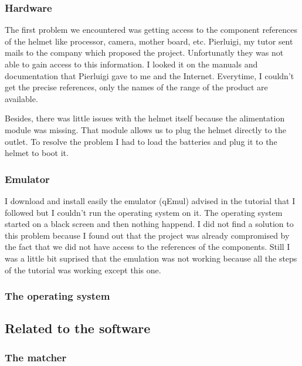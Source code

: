 	\subsubsection{Hardware}
	\par The first problem we encountered was getting access to the component references of the helmet like processor, camera, mother board, etc. Pierluigi, my tutor sent mails to the company which proposed the project. Unfortunatly they was not able to gain access to this information. I looked it on the manuals and documentation that Pierluigi gave to me and the Internet. Everytime, I couldn't get the precise references, only the names of the range of the product are available.

	\par Besides, there was little issues with the helmet itself because the alimentation module was missing. That module allows us to plug the helmet directly to the outlet. To resolve the problem I had to load the batteries and plug it to the helmet to boot it.

	\subsubsection{Emulator}
	
	\par I download and install easily the emulator (qEmul) advised in the tutorial that I followed but I couldn't run the operating system on  it. The operating system started on a black screen and then nothing happend. I did not find a solution to this problem because I found out that the project was already compromised by the fact that we did not have access to the references of the components. Still I was a little bit suprised that the emulation was not working because all the steps of the tutorial was working except this one.
	
	\subsubsection{The operating system}
	
	\subsection{Related to the software}
	
	\subsubsection{The matcher}
	
